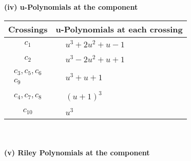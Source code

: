 \documentclass[1p]{elsarticle_modified}
\theoremstyle{definition}
\begin{document}
\newpage\renewcommand{\arraystretch}{1}
\flushleft \textbf{(iv) u-Polynomials at the component}\newline \\
\begin{tabular}{m{50pt}|m{274pt}}
Crossings & \hspace{64pt}u-Polynomials at each crossing \\
\hline $$\begin{aligned}c_{1}\end{aligned}$$&$\begin{aligned}
&u^3+2 u^2+u-1
\end{aligned}$\\
\hline $$\begin{aligned}c_{2}\end{aligned}$$&$\begin{aligned}
&u^3-2 u^2+u+1
\end{aligned}$\\
\hline $$\begin{aligned}c_{3},c_{5},c_{6}\\c_{9}\end{aligned}$$&$\begin{aligned}
&u^3+u+1
\end{aligned}$\\
\hline $$\begin{aligned}c_{4},c_{7},c_{8}\end{aligned}$$&$\begin{aligned}
&(u+1)^3
\end{aligned}$\\
\hline $$\begin{aligned}c_{10}\end{aligned}$$&$\begin{aligned}
&u^3
\end{aligned}$\\
\hline
\end{tabular}\\~\\
\newpage\renewcommand{\arraystretch}{1}
\flushleft \textbf{(v) Riley Polynomials at the component}\newline \\
\end{document}

